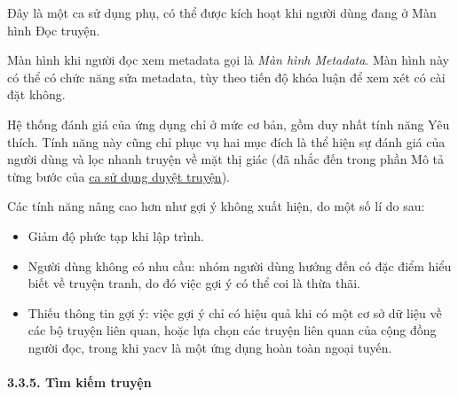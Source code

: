 \documentclass[
]{article}
\providecommand{\tightlist}{%
  \setlength{\itemsep}{0pt}\setlength{\parskip}{0pt}}
\begin{document}
Đây là một ca sử dụng phụ, có thể được kích hoạt khi người dùng đang ở
Màn hình Đọc truyện.

Màn hình khi người đọc xem metadata gọi là \emph{Màn hình Metadata}. Màn
hình này có thể có chức năng sửa metadata, tùy theo tiến độ khóa luận để
xem xét có cài đặt không.

Hệ thống đánh giá của ứng dụng chỉ ở mức cơ bản, gồm duy nhất tính năng
Yêu thích. Tính năng này cũng chỉ phục vụ hai mục đích là thể hiện sự
đánh giá của người dùng và lọc nhanh truyện về mặt thị giác (đã nhắc đến
trong phần Mô tả từng bước của \protect\hyperlink{P3.3.2-browsing}{ca sử
dụng duyệt truyện}).

Các tính năng nâng cao hơn như gợi ý không xuất hiện, do một số lí do
sau:

\begin{itemize}
\tightlist
\item
  Giảm độ phức tạp khi lập trình.
\item
  Người dùng không có nhu cầu: nhóm người dùng hướng đến có đặc điểm
  hiểu biết về truyện tranh, do đó việc gợi ý có thể coi là thừa thãi.
\item
  Thiếu thông tin gợi ý: việc gợi ý chỉ có hiệu quả khi có một cơ sở dữ
  liệu về các bộ truyện liên quan, hoặc lựa chọn các truyện liên quan
  của cộng đồng người đọc, trong khi yacv là một ứng dụng hoàn toàn
  ngoại tuyến.
\end{itemize}

\hypertarget{tuxecm-kiux1ebfm-truyux1ec7n}{%
\paragraph{\texorpdfstring{3.3.5. Tìm kiếm truyện
}{3.3.5. Tìm kiếm truyện }}\label{tuxecm-kiux1ebfm-truyux1ec7n}}
\end{document}
